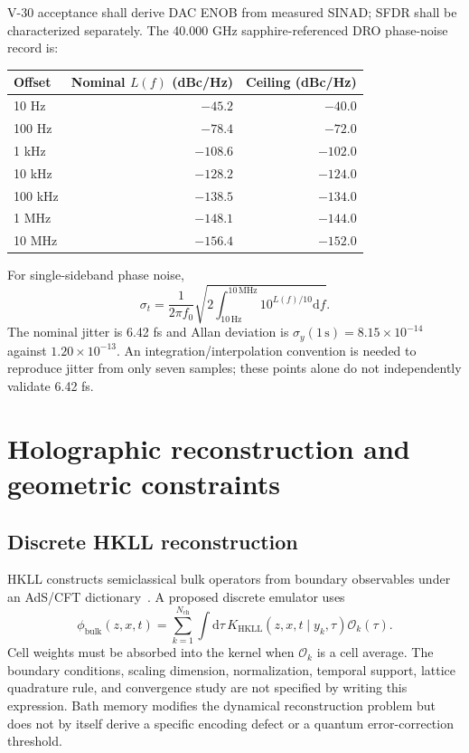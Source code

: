 \documentclass[11pt,a4paper]{article}
\newcommand{\dd}{\mathrm d}
\newcommand{\unit}[1]{\,\mathrm{#1}}
\begin{document}
V-30 acceptance shall derive DAC ENOB from measured SINAD; SFDR shall be characterized separately.
The 40.000 GHz sapphire-referenced DRO phase-noise record is:
\begin{center}\small
\begin{tabular}{@{}lrr@{}}\toprule Offset & Nominal $L(f)$ (dBc/Hz) & Ceiling (dBc/Hz)\\\midrule
10 Hz & $-45.2$ & $-40.0$\\100 Hz & $-78.4$ & $-72.0$\\
1 kHz & $-108.6$ & $-102.0$\\10 kHz & $-128.2$ & $-124.0$\\
100 kHz & $-138.5$ & $-134.0$\\1 MHz & $-148.1$ & $-144.0$\\
10 MHz & $-156.4$ & $-152.0$\\\bottomrule
\end{tabular}\end{center}
For single-sideband phase noise,
\[
 \sigma_t=\frac{1}{2\pi f_0}\sqrt{2\int_{10\,\mathrm{Hz}}^{10\,\mathrm{MHz}}
 10^{L(f)/10}\dd f}.
\]
The nominal jitter is 6.42 fs and Allan deviation is $\sigma_y(1\unit s)=8.15\times10^{-14}$ against
$1.20\times10^{-13}$. An integration/interpolation convention is needed to reproduce jitter
from only seven samples; these points alone do not independently validate 6.42 fs.

\section{Holographic reconstruction and geometric constraints}
\label{sec:holo}
\subsection{Discrete HKLL reconstruction}
HKLL constructs semiclassical bulk operators from boundary observables under an AdS/CFT
dictionary~\cite{hkll}. A proposed discrete emulator uses
\[
 \phi_{\mathrm{bulk}}(z,x,t)=\sum_{k=1}^{N_{\mathrm{ch}}}\int\dd\tau\,
 K_{\mathrm{HKLL}}(z,x,t\mid y_k,\tau)\mathcal O_k(\tau).
\]
Cell weights must be absorbed into the kernel when $\mathcal O_k$ is a cell average.
The boundary conditions, scaling dimension, normalization, temporal support, lattice
quadrature rule, and convergence study are not specified by writing this expression.
Bath memory modifies the dynamical reconstruction problem but does not by itself derive a
specific encoding defect or a quantum error-correction threshold.
\end{document}
